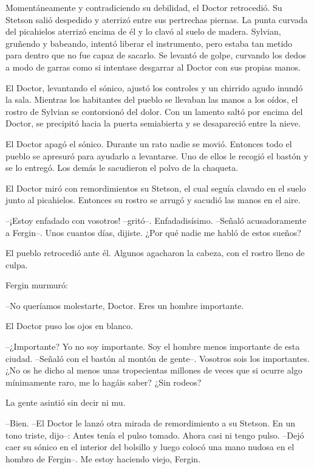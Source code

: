 Momentáneamente y contradiciendo su debilidad, el Doctor retrocedió. Su Stetson salió despedido y aterrizó entre sus pertrechas piernas. La punta curvada del picahielos aterrizó encima de él y lo clavó al suelo de madera. Sylvian, gruñendo y babeando, intentó liberar el instrumento, pero estaba tan metido para dentro que no fue capaz de sacarlo. Se levantó de golpe, curvando los dedos a modo de garras como si intentase desgarrar al Doctor con sus propias manos.

El Doctor, levantando el sónico, ajustó los controles y un chirrido agudo inundó la sala. Mientras los habitantes del pueblo se llevaban las manos a los oídos, el rostro de Sylvian se contorsionó del dolor. Con un lamento saltó por encima del Doctor, se precipitó hacia la puerta semiabierta y se desapareció entre la nieve.

El Doctor apagó el sónico. Durante un rato nadie se movió. Entonces todo el pueblo se apresuró para ayudarlo a levantarse. Uno de ellos le recogió el bastón y se lo entregó. Los demás le sacudieron el polvo de la chaqueta.

El Doctor miró con remordimientos su Stetson, el cual seguía clavado en el suelo junto al picahielos. Entonces su rostro se arrugó y sacudió las manos en el aire.

--¡Estoy enfadado con vosotros! --gritó--. Enfadadisísimo. --Señaló acusadoramente a Fergin--. Unos cuantos días, dijiste. ¿Por qué nadie me habló de estos sueños?

El pueblo retrocedió ante él. Algunos agacharon la cabeza, con el rostro lleno de culpa.

Fergin murmuró:

--No queríamos molestarte, Doctor. Eres un hombre importante.

El Doctor puso los ojos en blanco.

--¿Importante? Yo no soy importante. Soy el hombre menos importante de esta ciudad. --Señaló con el bastón al montón de gente--. Vosotros sois los importantes. ¿No os he dicho al menos unas tropecientas millones de veces que si ocurre algo mínimamente raro, me lo hagáis saber? ¿Sin rodeos?

La gente asintió sin decir ni mu. 

--Bien. --El Doctor le lanzó otra mirada de remordimiento a su Stetson. En un tono triste, dijo--: Antes tenía el pulso tomado. Ahora casi ni tengo pulso. --Dejó caer su sónico en el interior del bolsillo y luego colocó una mano nudosa en el hombro de Fergin--. Me estoy haciendo viejo, Fergin.

